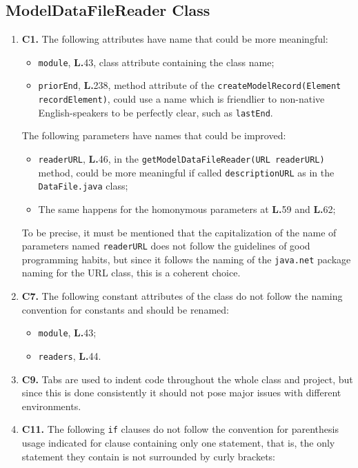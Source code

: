\subsection{ModelDataFileReader Class}
\begin{enumerate}
\item \textbf{C1.} The following attributes have name that could be more meaningful:
	\begin{itemize}
	\item \texttt{module}, \textbf{L.}43, class attribute containing the class name;
	\item \texttt{priorEnd}, \textbf{L.}238, method attribute of the \texttt{createModelRecord(Element recordElement)}, could use a name which is friendlier to non-native English-speakers to be perfectly clear, such as \texttt{lastEnd}.
	\end{itemize}	
The following parameters have names that could be improved:
	\begin{itemize}
	\item \texttt{readerURL}, \textbf{L.}46, in the \texttt{getModelDataFileReader(URL readerURL)} method, could be more meaningful if called \texttt{descriptionURL} as in the \texttt{DataFile.java} class;
	\item The same happens for the homonymous parameters at \textbf{L.}59 and \textbf{L.}62;
	\end{itemize}
To be precise, it must be mentioned that the capitalization of the name of parameters named \texttt{readerURL} does not follow the guidelines of good programming habits, but since it follows the naming of the \texttt{java.net} package naming for the URL class, this is a coherent choice.
\item \textbf{C7.} The following constant attributes of the class do not follow the naming convention for constants and should be renamed:
	\begin{itemize}
	\item \texttt{module}, \textbf{L.}43;
	\item \texttt{readers}, \textbf{L.}44.
	\end{itemize}
\item \textbf{C9.} Tabs are used to indent code throughout the whole class and project, but since this is done consistently it should not pose major issues with different environments.
\item \textbf{C11.} The following \texttt{if} clauses do not follow the convention for parenthesis usage indicated for clause containing only one statement, that is, the only statement they contain is not surrounded by curly brackets:

\end{enumerate}
